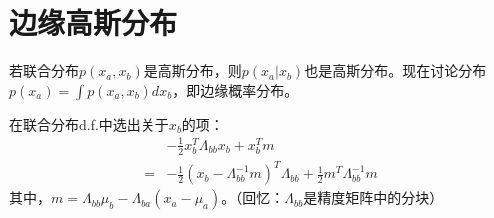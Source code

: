 \documentclass[cn,black,12pt,normal]{elegantnote}
\begin{document}
\section{边缘高斯分布}
若联合分布$p(x_a,x_b)$是高斯分布，则$p(x_a| x_b)$也是高斯分布。现在讨论分布$p(x_a)=\int p(x_a,x_b) dx_b$，即边缘概率分布。

在联合分布d.f.中选出关于$x_b$的项：
\begin{align*}
& -\frac{1}{2} x_b^T\Lambda_{bb}x_b+x_b^Tm\\
= & -\frac{1}{2} (x_b-\Lambda_{bb}^{-1}m)^T\Lambda_{bb} + \frac{1}{2}m^T\Lambda_{bb}^{-1}m
\end{align*}
其中，$m = \Lambda_{bb}\mu_b - \Lambda_{ba}(x_a-\mu_a)$。（回忆：$\Lambda_{bb}$是精度矩阵中的分块）
\end{document}
